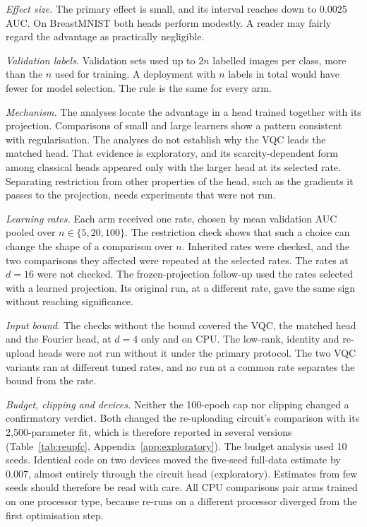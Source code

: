 \documentclass{ieeeaccess}
\newcommand{\vqc}{VQC}
\begin{document}
\emph{Effect size.} The primary effect is small, and its interval reaches down to 0.0025 AUC. On BreastMNIST both heads perform modestly. A reader may fairly regard the advantage as practically negligible.

\emph{Validation labels.} Validation sets used up to $2n$ labelled images per class, more than the $n$ used for training. A deployment with $n$ labels in total would have fewer for model selection. The rule is the same for every arm.

\emph{Mechanism.} The analyses locate the advantage in a head trained together with its projection. Comparisons of small and large learners show a pattern consistent with regularisation. The analyses do not establish why the \vqc{} leads the matched head. That evidence is exploratory, and its scarcity-dependent form among classical heads appeared only with the larger head at its selected rate. Separating restriction from other properties of the head, such as the gradients it passes to the projection, needs experiments that were not run.

\emph{Learning rates.} Each arm received one rate, chosen by mean validation AUC pooled over $n\in\{5,20,100\}$. The restriction check shows that such a choice can change the shape of a comparison over $n$. Inherited rates were checked, and the two comparisons they affected were repeated at the selected rates. The rates at $d=16$ were not checked. The frozen-projection follow-up used the rates selected with a learned projection. Its original run, at a different rate, gave the same sign without reaching significance.

\emph{Input bound.} The checks without the bound covered the \vqc{}, the matched head and the Fourier head, at $d=4$ only and on CPU. The low-rank, identity and re-upload heads were not run without it under the primary protocol. The two \vqc{} variants ran at different tuned rates, and no run at a common rate separates the bound from the rate.

\emph{Budget, clipping and devices.} Neither the 100-epoch cap nor clipping changed a confirmatory verdict. Both changed the re-uploading circuit's comparison with its 2,500-parameter fit, which is therefore reported in several versions (Table~\ref{tab:reupfc}, Appendix~\ref{app:exploratory}). The budget analysis used 10 seeds. Identical code on two devices moved the five-seed full-data estimate by 0.007, almost entirely through the circuit head (exploratory). Estimates from few seeds should therefore be read with care. All CPU comparisons pair arms trained on one processor type, because re-runs on a different processor diverged from the first optimisation step.
\end{document}
